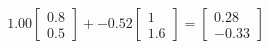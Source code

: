 \documentclass[preview]{standalone}
\begin{document}
\begin{align*}
1.00 \begin{bmatrix} 0.8 \\ 0.5 \end{bmatrix} + -0.52 \begin{bmatrix} 1 \\ 1.6 \end{bmatrix} = \begin{bmatrix} 0.28 \\ -0.33 \end{bmatrix}
\end{align*}
\end{document}
